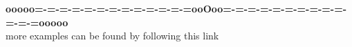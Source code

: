 \documentclass{ximera}
\begin{document}
\begin{center}
\textbf{\textcolor{green!50!black}{ooooo=-=-=-=-=-=-=-=-=-=-=-=-=ooOoo=-=-=-=-=-=-=-=-=-=-=-=-=ooooo}} \\

more examples can be found by following this link\\ 

\end{center}
\end{document}
